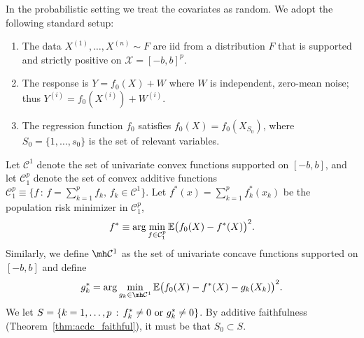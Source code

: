In the probabilistic setting we treat the covariates as random.  We
adopt the following standard setup:

\begin{enumerate}
\item The data $X^{(1)},\ldots, X^{(n)} \sim F$ are iid from
a distribution $F$ that is supported and strictly positive on $\mathcal{X}=[-b,b]^p$. 
\item The response is $Y = f_0(X) + W$ where $W$ is
  independent, zero-mean noise; thus $Y^{(i)} = f_0(X^{(i)}) + W^{(i)}$.
\item The regression function $f_0$ satisfies
$f_0(X) = f_0(X_{S_0})$, where $S_0 = \{1,\ldots,s_0\}$ is the set of
relevant variables.
\end{enumerate}


Let $\mathcal{C}^1$ denote the set of univariate convex functions
supported on $[-b,b]$, 
and let  $\mathcal{C}_1^{p}$ denote the set of convex additive functions
$\mathcal{C}_1^p \equiv \{ f \,:\, f = \sum_{k=1}^p f_k, \,
   f_k \in \mathcal{C}^1 \} $.  
Let $f^*(x) = \sum_{k=1}^p f^*_k(x_k)$ be the population risk
minimizer in $\mathcal{C}_1^p$, 
\begin{equation}
f^* \equiv \arg\min_{f \in \mathcal{C}_1^p} {\mathbb E}\big(f_0(X) - f^*(X)
\big)^2.
\end{equation}
Similarly, we define $\mh \mathcal{C}^1$ as the set of univariate concave functions supported on $[-b, b]$ and define
\begin{equation}
g^*_k = \arg\min_{g_k \in \mh \mathcal{C}^1} \E \big( f_0(X) - f^*(X)
- g_k(X_k) \big)^2.
\end{equation}
We let $S = \{ k = 1,\ldots,p \,:\, f^*_k \neq 0 \textrm{ or } g^*_k \neq 0\}$. By additive faithfulness (Theorem~\ref{thm:acdc_faithful}), it must be that $S_0 \subset S$. 


